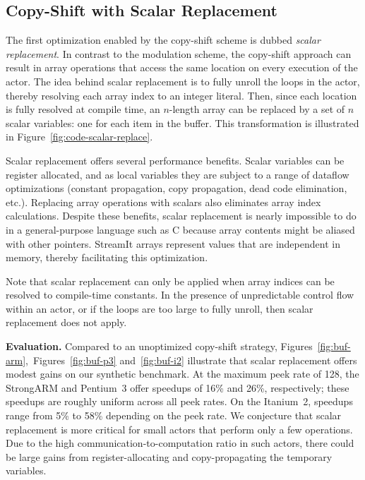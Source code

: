 \documentclass{sigplanconf}
\begin{document}
\subsection{Copy-Shift with Scalar Replacement}
\label{sec:scalar-replacement}

The first optimization enabled by the copy-shift scheme is dubbed {\it
scalar replacement}.  In contrast to the modulation scheme, the
copy-shift approach can result in array operations that access the
same location on every execution of the actor.  The idea behind
scalar replacement is to fully unroll the loops in the actor, thereby
resolving each array index to an integer literal.  Then, since each
location is fully resolved at compile time, an $n$-length array can be
replaced by a set of $n$ scalar variables: one for each item in the
buffer.  This transformation is illustrated in
Figure~\ref{fig:code-scalar-replace}.

Scalar replacement offers several performance benefits. Scalar
variables can be register allocated, and as local variables they are
subject to a range of dataflow optimizations (constant propagation,
copy propagation, dead code elimination, etc.).  Replacing array
operations with scalars also eliminates array index calculations.
Despite these benefits, scalar replacement is nearly impossible to do
in a general-purpose language such as C because array contents might
be aliased with other pointers.  StreamIt arrays represent values that
are independent in memory, thereby facilitating this optimization.

Note that scalar replacement can only be applied when array indices
can be resolved to compile-time constants.  In the presence of unpredictable
control flow within an actor, or if the loops are too large to fully unroll,
then scalar replacement does not apply.

{\bf Evaluation.}  Compared to an unoptimized copy-shift strategy,
Figures~\ref{fig:buf-arm},~Figures~\ref{fig:buf-p3}
and~\ref{fig:buf-i2} illustrate that scalar replacement offers
modest gains on our synthetic benchmark.  At the maximum peek rate of
128, the StrongARM and Pentium~3 offer speedups of 16\% and 26\%,
respectively; these speedups are roughly uniform across all peek rates.
On the Itanium~2, speedups range from 5\% to 58\% depending on the
peek rate.  We conjecture that scalar replacement is more critical for
small actors that perform only a few operations.  Due to the high
communication-to-computation ratio in such actors, there could be
large gains from register-allocating and copy-propagating the
temporary variables.
\end{document}
